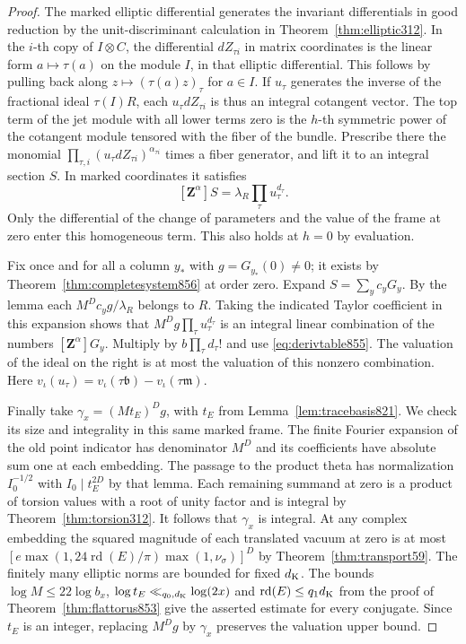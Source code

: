 \documentclass[a4paper,11pt]{article}
\theoremstyle{definition}
\theoremstyle{remark}
\numberwithin{equation}{section}
\begin{document}
\begin{proof}
The marked elliptic differential generates the invariant
differentials in good reduction by the unit-discriminant
calculation in Theorem~\ref{thm:elliptic312}. In the \(i\)-th
copy of \(I\otimes C\), the differential \(dZ_{\tau i}\)
in matrix coordinates is the linear form \(a\mapsto\tau(a)\)
on the module \(I\), in that elliptic differential. This
follows by pulling back along \(z\mapsto(\tau(a)z)_\tau\)
for \(a\in I\). If \(u_\tau\) generates the inverse of the
fractional ideal \(\tau(I)R\), each \(u_\tau dZ_{\tau i}\)
is thus an integral cotangent vector. The top term of the
jet module with all lower terms zero is the \(h\)-th symmetric
power of the cotangent module tensored with the fiber of the
bundle. Prescribe there the monomial
\(\prod_{\tau,i}(u_\tau dZ_{\tau i})^{\alpha_{\tau i}}\)
times a fiber generator, and lift it to an integral section
\(S\). In marked coordinates it satisfies
\[
            [\mathbf Z^\alpha]S
                       =\lambda_R\prod_\tau u_\tau^{d_\tau}.
\]
Only the differential of the change of parameters and the
value of the frame at zero enter this homogeneous term. This
also holds at \(h=0\) by evaluation.

Fix once and for all a column \(y_*\) with \(g=G_{y_*}(0)\ne0\);
it exists by Theorem~\ref{thm:completesystem856} at order zero.
Expand \(S=\sum_y c_y G_y\). By the lemma each
\(M^Dc_yg/\lambda_R\) belongs to \(R\). Taking the indicated
Taylor coefficient in this expansion shows that \(M^Dg
\prod_\tau u_\tau^{d_\tau}\) is an integral linear combination
of the numbers \([\mathbf Z^\alpha]G_y\). Multiply by
\(b\prod_\tau d_\tau!\) and use \eqref{eq:derivtable855}.
The valuation of the ideal on the right is at most the valuation
of this nonzero combination. Here
\(v_\iota(u_\tau)=v_\iota(\tau\mathfrak b)
                  -v_\iota(\tau\mathfrak m)\).

Finally take \(\gamma_x=(Mt_E)^D g\), with \(t_E\) from
Lemma~\ref{lem:tracebasis821}. We check its size and integrality
in this same marked frame. The finite Fourier expansion of the
old point indicator has denominator \(M^D\) and its coefficients
have absolute sum one at each embedding. The passage to the
product theta has normalization \(I_0^{-1/2}\) with
\(I_0\mid t_E^{2D}\) by that lemma. Each remaining summand
at zero is a product of torsion values with a root of unity
factor and is integral by Theorem~\ref{thm:torsion312}.
It follows that \(\gamma_x\) is integral. At any complex
embedding the squared magnitude of each translated vacuum
at zero is at most
\([e\max(1,24\operatorname{rd}(E)/\pi)\max(1,\nu_\sigma)]^D\)
by Theorem~\ref{thm:transport59}. The finitely many elliptic
norms are bounded for fixed \(d_{\rm K}\). The bounds
\(\log M\le22\log b_x\), \(\log t_E\ll_{q_0,d_{\rm K}}\log(2x)\)
and \(\operatorname{rd}(E)\le q_1d_{\rm K}\) from the proof of
Theorem~\ref{thm:flattorus853} give the asserted estimate
for every conjugate. Since \(t_E\) is an integer, replacing
\(M^D g\) by \(\gamma_x\) preserves the valuation upper bound.
\end{proof}
\end{document}
